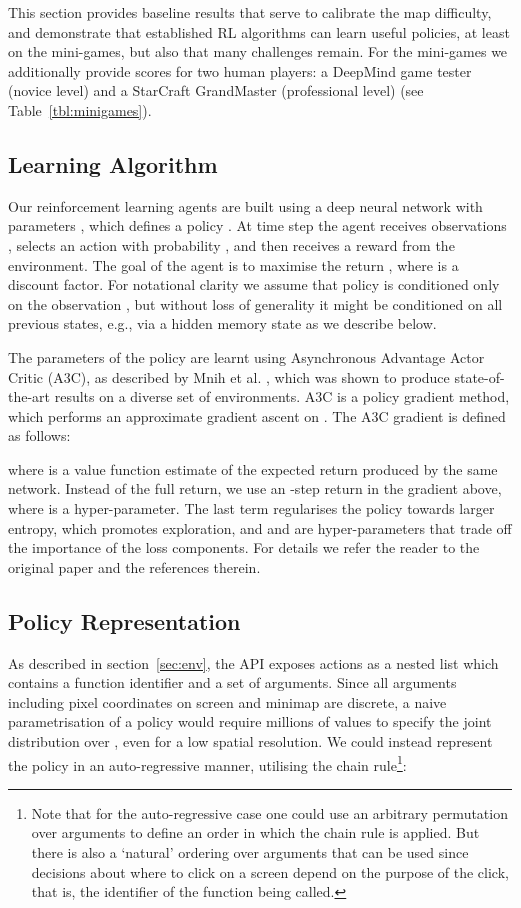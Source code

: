 \documentclass{article}
\begin{document}
This section provides baseline results that serve to calibrate the map difficulty, and demonstrate that established RL algorithms can learn useful policies, at least on the mini-games, but also that many challenges remain. For the mini-games we additionally provide scores for two human players: a DeepMind game tester (novice level) and a StarCraft GrandMaster (professional level) (see Table~\ref{tbl:minigames}).

\subsection{Learning Algorithm}

Our reinforcement learning agents are built using a deep neural network with parameters , which defines a policy .  
At time step  the agent receives observations , selects an action  with probability , and then receives a reward  from the environment. The goal of the agent is to maximise the return , where  is a discount factor.
For notational clarity we assume that policy is conditioned only on the observation , but without loss of generality it might be conditioned on all previous states, e.g., via a hidden memory state as we describe below. 

The parameters of the policy are learnt using Asynchronous Advantage Actor Critic (A3C), as described by Mnih et al. \cite{mnih2016asynchronous}, which was shown to produce state-of-the-art results on a diverse set of environments. A3C is a policy gradient method, which performs an approximate gradient ascent on . The A3C gradient is defined as follows:



where  is a value function estimate of the expected return  produced by the same network.  Instead of the full return, we use an -step return  in the gradient above, where  is a hyper-parameter.  The last term regularises the policy towards larger entropy, which promotes exploration, and  and  are hyper-parameters that trade off the importance of the loss components. For details we refer the reader to the original paper \cite{mnih2016asynchronous} and the references therein.

\subsection{Policy Representation}\label{sec:policy_representation}

As described in section~\ref{sec:env}, the API exposes actions as a nested list  which contains a function identifier  and a set of arguments. Since all arguments including pixel coordinates on screen and minimap are discrete, a naive parametrisation of a policy  would require millions of values to specify the joint distribution over , even for a low spatial resolution.
We could instead represent the policy in an auto-regressive manner, utilising the chain rule\footnote{Note that for the auto-regressive case one could use an arbitrary permutation over arguments to define an order in which the chain rule is applied.  But there is also a `natural' ordering over arguments that can be used since decisions about where to click on a screen depend on the purpose of the click, that is, the identifier of the function being called.}:
\end{document}
